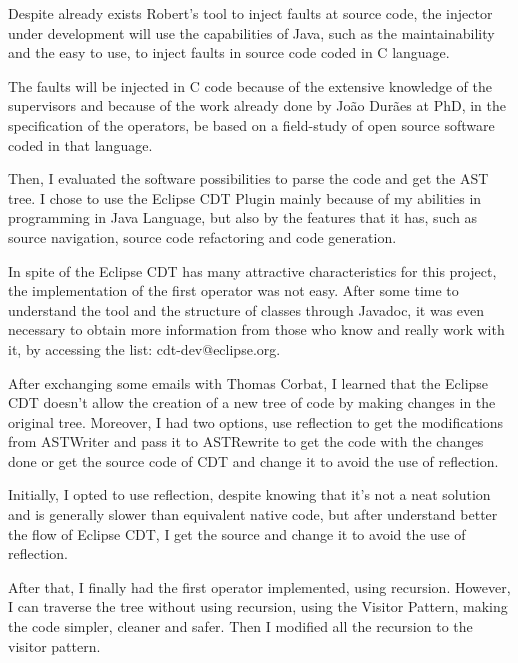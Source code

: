 Despite already exists Robert's tool to inject faults at source code, the injector under development will use the capabilities of Java, such as the maintainability and the easy to use, to inject faults in source code coded in C language.

The faults will be injected in C code because of the extensive knowledge of the supervisors and because of the work already done by João Durães at PhD, in the specification of the operators, be based on a field-study of open source software coded in that language.

Then, I evaluated the software possibilities to parse the code and get the AST tree. I chose to use the Eclipse CDT Plugin mainly because of my abilities in programming in Java Language, but also by the features that it has, such as source navigation, source code refactoring and code generation.

In spite of the Eclipse CDT has many attractive characteristics for this project, the implementation of the first operator was not easy. After some time to understand the tool and the structure of classes through Javadoc, it was even necessary to obtain more information from those who know and really work with it, by accessing the list: cdt-dev@eclipse.org.

After exchanging some emails with Thomas Corbat, I learned that the Eclipse CDT doesn't allow the creation of a new tree of code by making changes in the original tree. Moreover, I had two options, use reflection to get the modifications from ASTWriter and pass it to ASTRewrite to get the code with the changes done or get the source code of CDT and change it to avoid the use of reflection.

Initially, I opted to use reflection, despite knowing that it's not a neat solution and is generally slower than equivalent native code, but after understand better the flow of Eclipse CDT, I get the source and change it to avoid the use of reflection.

After that, I finally had the first operator implemented, using recursion. However, I can traverse the tree without using recursion, using the Visitor Pattern, making the code simpler, cleaner and safer. Then I modified all the recursion to the visitor pattern.




